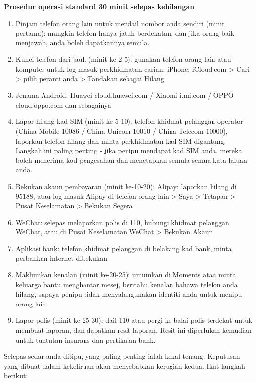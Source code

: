 \textbf{Prosedur operasi standard 30 minit selepas kehilangan}\par

\begin{enumerate}
  \item Pinjam telefon orang lain untuk mendail nombor anda sendiri (minit pertama): mungkin telefon hanya jatuh berdekatan, dan jika orang baik menjawab, anda boleh dapatkannya semula.
  \item Kunci telefon dari jauh (minit ke-2-5): gunakan telefon orang lain atau komputer untuk log masuk perkhidmatan carian: iPhone: iCloud.com > Cari > pilih peranti anda > Tandakan sebagai Hilang
  \item Jenama Android: Huawei cloud.huawei.com / Xiaomi i.mi.com / OPPO cloud.oppo.com dan sebagainya
  \item Lapor hilang kad SIM (minit ke-5-10): telefon khidmat pelanggan operator (China Mobile 10086 / China Unicom 10010 / China Telecom 10000), laporkan telefon hilang dan minta perkhidmatan kad SIM digantung. Langkah ini paling penting - jika penipu mendapat kad SIM anda, mereka boleh menerima kod pengesahan dan menetapkan semula semua kata laluan anda.
  \item Bekukan akaun pembayaran (minit ke-10-20): Alipay: laporkan hilang di 95188, atau log masuk Alipay di telefon orang lain > Saya > Tetapan > Pusat Keselamatan > Bekukan Segera
  \item WeChat: selepas melaporkan polis di 110, hubungi khidmat pelanggan WeChat, atau di Pusat Keselamatan WeChat > Bekukan Akaun
  \item Aplikasi bank: telefon khidmat pelanggan di belakang kad bank, minta perbankan internet dibekukan
  \item Maklumkan kenalan (minit ke-20-25): umumkan di Moments atau minta keluarga bantu menghantar mesej, beritahu kenalan bahawa telefon anda hilang, supaya penipu tidak menyalahgunakan identiti anda untuk menipu orang lain.
  \item Lapor polis (minit ke-25-30): dail 110 atau pergi ke balai polis terdekat untuk membuat laporan, dan dapatkan resit laporan. Resit ini diperlukan kemudian untuk tuntutan insurans dan pertikaian bank.
\end{enumerate}


Selepas sedar anda ditipu, yang paling penting ialah kekal tenang. Keputusan yang dibuat dalam kekeliruan akan menyebabkan kerugian kedua. Ikut langkah berikut:

